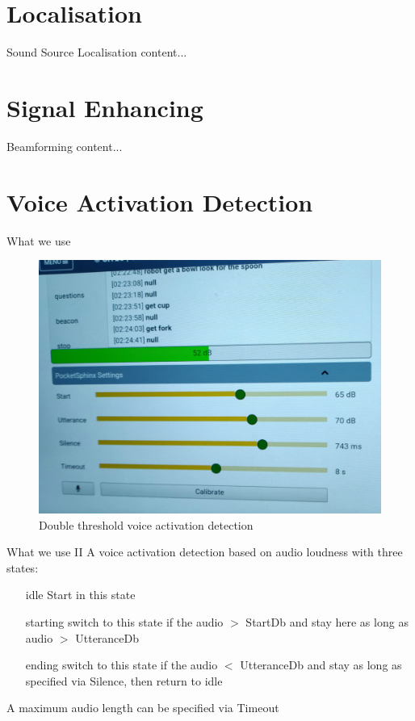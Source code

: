 \documentclass{beamer}
\begin{document}
	\section{Localisation}%
	
	\begin{frame}{Sound Source Localisation}
		content...
	\end{frame}
	
	\section{Signal Enhancing}%
	
	\begin{frame}{Beamforming}
		content...
	\end{frame}
	
	\section{Voice Activation Detection}%
	
	\begin{frame}{What we use}
		\begin{figure}[ht]
			\centering
			\includegraphics[width=.8\linewidth]{Bilder/VAD.jpg}
			\caption{Double threshold voice activation detection}
		\end{figure}
	\end{frame}
	
	\begin{frame}{What we use II}
		A voice activation detection based on audio loudness with three states: 
		\begin{itemize}
			\item[idle] Start in this state
			\item[starting] switch to this state if the audio $>$ StartDb and stay here as long as audio $>$ UtteranceDb
			\item[ending] switch to this state if the audio $<$ UtteranceDb and stay as long as specified via Silence, then return to idle
		\end{itemize}
		A maximum audio length can be specified via Timeout
	\end{frame}
	
\end{document}
